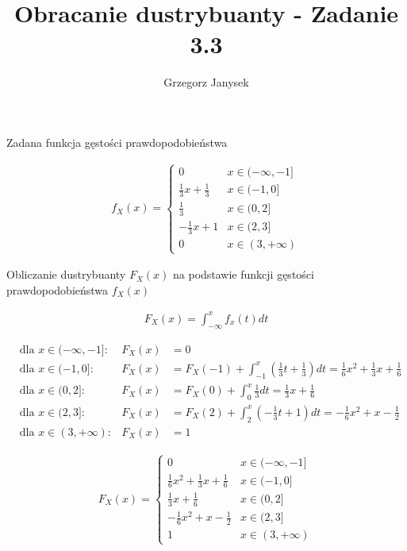 \documentclass[11pt]{extarticle}
\author{Grzegorz Janysek}
\title{Obracanie dustrybuanty - Zadanie 3.3}
\begin{document}
	\maketitle

	Zadana funkcja gęstości prawdopodobieństwa

	\begin{align}
		f_X(x) = \begin{cases} 
			0 							& x \in (-\infty, -1] \\
			\frac{1}{3}x + \frac{1}{3} 	& x \in (-1, 0] \\
			\frac{1}{3} 				& x \in (0, 2] \\
			-\frac{1}{3}x + 1 			& x \in (2, 3] \\
			0 							& x \in (3, +\infty)
		\end{cases}
	\end{align}
	
	Obliczanie dustrybuanty \( F_X(x) \) na podstawie funkcji gęstości prawdopodobieństwa \( f_X(x) \)

	\begin{align}
		F_X(x) = \int_{-\infty}^x f_x(t)dt
	\end{align}

	\begin{align}
		&\text{dla } x \in (-\infty, -1] :&
			F_X(x) &= 0 \\
		&\text{dla } x \in (-1, 0] :&
			F_X(x) &=
			F_X(-1) +
			\int_{-1}^{x} (\frac{1}{3}t + \frac{1}{3}) dt =
			\frac{1}{6}x^2 + \frac{1}{3}x + \frac{1}{6} \\
		&\text{dla } x \in (0, 2] :&
			F_X(x) &=
			F_X(0) +
			\int_0^x \frac{1}{3}dt =
			\frac{1}{3}x + \frac{1}{6} \\
		&\text{dla } x \in (2, 3] :&
			F_X(x) &= F_X(2) + \int_2^x (-\frac{1}{3}t + 1) dt =
			-\frac{1}{6}x^2 + x - \frac{1}{2} \\
		&\text{dla } x \in (3, +\infty) :&
			F_X(x) &= 1
	\end{align}

	\begin{align}
		F_X(x) = \begin{cases} 
			0 												& x \in (-\infty, -1] \\
			\frac{1}{6}x^2 + \frac{1}{3}x + \frac{1}{6}		& x \in (-1, 0] \\
			\frac{1}{3}x + \frac{1}{6}						& x \in (0, 2] \\
			-\frac{1}{6}x^2 + x - \frac{1}{2}				& x \in (2, 3] \\
			1 												& x \in (3, +\infty)
		\end{cases}
	\end{align}
\end{document}
